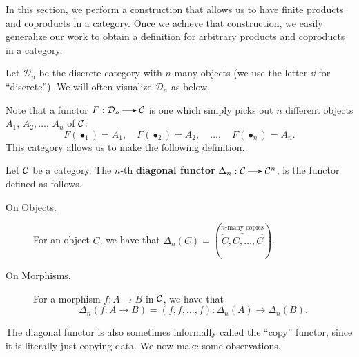    In this section, we perform a construction that allows us to have finite products and coproducts 
    in a category. Once we achieve that construction, we easily generalize our work 
    to obtain a definition for arbitrary products and coproducts in a category.
    \begin{definition}
    Let $\mathcal{D}_n$ be the discrete category with $n$-many objects (we use the letter $\dd$ for ``discrete''). 
    We will often visualize $\mathcal{D}_n$ as below.  
    \begin{align_topbot}
    \end{align_topbot}
    Note that 
    a functor $F: \dd_n \to \cc$ is one which simply picks out $n$ different objects $A_1$, $A_2, 
    \dots$, $A_n$ of $\mathcal{C}$:
    \[
        F(\bullet_1) = A_1, \quad F(\bullet_2) = A_2, \quad  \dots,
        \quad
        F(\bullet_n) = A_n.
    \]
    This category allows us to make the following definition. 

    \begin{definition}
        Let $\mathcal{C}$ be a category.
        The $n$-th \textbf{diagonal functor} $\Delta_n: \cc \to \cc^{n}$,
        is the functor defined as follows. 
        \begin{description}
            \item[On Objects.] For an object $C$, we have that $\Delta_n(C) = (\overbrace{C, C, \dots, C}^{n\text{-many copies}})$.
            \item[On Morphisms.] For a morphism $f: A \to B$ in $\mathcal{C}$, we have that  
            \[
                \Delta_n(f: A \to B) = (f, f, \dots, f): \Delta_n(A) \to \Delta_n(B).
            \]    
        \end{description}
    \end{definition}
    The diagonal  functor is also sometimes informally called the 
    ``copy'' functor, since it is literally just copying data. We now 
    make some observations. 


\end{definition}
